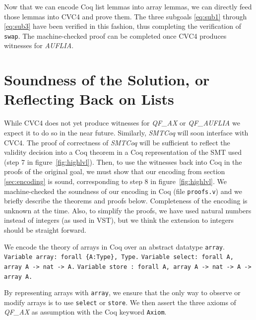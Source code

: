\documentclass[onecolumn, preprint]{sigplanconf}
\begin{document}
%

Now that we can encode Coq list lemmas into array lemmas, we can directly feed those lemmas into CVC4 and prove them. The three subgoals \ref{eq:sub1} through \ref{eq:sub3} have been verified in this fashion, thus completing the verification of \texttt{swap}. The machine-checked proof can be completed once CVC4 produces witnesses for \emph{AUFLIA}.


\section{Soundness of the Solution, or Reflecting Back on Lists}
\label{sec:proofs}
While CVC4 does not yet produce witnesses for \emph{QF\_AX} or \emph{QF\_AUFLIA} we expect it to do so in the near future. Similarly, \emph{SMTCoq} will soon interface with CVC4. The proof of correctness of \emph{SMTCoq} will be sufficient to reflect the validity decision into a Coq theorem in a Coq representation of the SMT used (step 7 in figure~\ref{fig:highlvl}). Then, to use the witnesses back into Coq in the proofs of the original goal, we must show that our encoding from section \ref{sec:encoding} is sound, corresponding to step 8 in figure~\ref{fig:highlvl}. We machine-checked the soundness of our encoding in Coq (file \texttt{proofs.v}) and we briefly describe the theorems and proofs below. Completeness of the encoding is unknown at the time. 
Also, to simplify the proofs, we have used natural numbers instead of integers (as used in VST), but we think the extension to integers should be straight forward.

We encode the theory of arrays in Coq over an abstract datatype \texttt{array}.  
 \newline
  \texttt{Variable array: forall \{A:Type\}, Type.} \newline
  \texttt{Variable select: forall {A}, array A -> nat -> A.} \newline
  \texttt{Variable store : forall {A}, array A -> nat -> A -> array A.}

By representing arrays with \texttt{array}, we ensure that the only way to observe or modify arrays is to use \texttt{select} or \texttt{store}. We then assert the three axioms of \emph{QF\_AX} as assumption with the Coq keyword \texttt{Axiom}.
\end{document}
